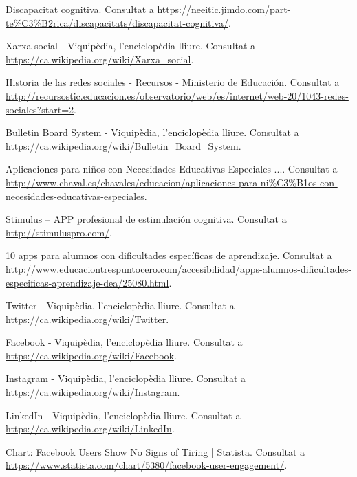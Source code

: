 \documentclass[11pt,catalan,listoffigures,listoftables]{tfgetsinf}
\begin{document}
\begin{thebibliography}{10}

   Discapacitat cognitiva.
   \newblock Consultat a 
   \url{https://neeitic.jimdo.com/part-te\%C3\%B2rica/discapacitats/discapacitat-cognitiva/}.

   Xarxa social - Viquipèdia, l'enciclopèdia lliure.
   \newblock Consultat a 
   \url{https://ca.wikipedia.org/wiki/Xarxa_social}.
   
   Historia de las redes sociales - Recursos - Ministerio de Educación.
   \newblock Consultat a 
   \url{http://recursostic.educacion.es/observatorio/web/es/internet/web-20/1043-redes-sociales?start=2}.

   Bulletin Board System - Viquipèdia, l'enciclopèdia lliure.
   \newblock Consultat a 
   \url{https://ca.wikipedia.org/wiki/Bulletin_Board_System}.

   Aplicaciones para niños con Necesidades Educativas Especiales ....
   \newblock Consultat a 
   \url{http://www.chaval.es/chavales/educacion/aplicaciones-para-ni\%C3\%B1os-con-necesidades-educativas-especiales}.

   Stimulus – APP profesional de estimulación cognitiva.
   \newblock Consultat a 
   \url{http://stimuluspro.com/}.

   10 apps para alumnos con dificultades específicas de aprendizaje.
   \newblock Consultat a 
   \url{http://www.educaciontrespuntocero.com/accesibilidad/apps-alumnos-dificultades-especificas-aprendizaje-dea/25080.html}.

   Twitter - Viquipèdia, l'enciclopèdia lliure.
   \newblock Consultat a 
   \url{https://ca.wikipedia.org/wiki/Twitter}.

   Facebook - Viquipèdia, l'enciclopèdia lliure.
   \newblock Consultat a 
   \url{https://ca.wikipedia.org/wiki/Facebook}.

   Instagram - Viquipèdia, l'enciclopèdia lliure.
   \newblock Consultat a 
   \url{https://ca.wikipedia.org/wiki/Instagram}.

   LinkedIn - Viquipèdia, l'enciclopèdia lliure.
   \newblock Consultat a 
   \url{https://ca.wikipedia.org/wiki/LinkedIn}.
   
   Chart: Facebook Users Show No Signs of Tiring | Statista.
   \newblock Consultat a 
   \url{https://www.statista.com/chart/5380/facebook-user-engagement/}.

\end{thebibliography}
\cleardoublepage
\end{document}
